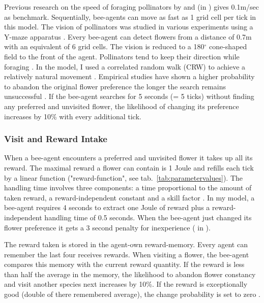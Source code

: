 Previous research on the speed of foraging pollinators by \cite{essenberg2012explaining} and \cite{kunin1991few} (in  \citealt{kunin1996pollinator}) gives 0.1m/sec as benchmark. Sequentially, bee-agents can move as fast as 1 grid cell per tick in this model. The vision of pollinators was studied in various experiments using a Y-maze apparatus \citep{dyer2008comparative, wertlen2008detection, ne2001effect}. Every bee-agent can detect flowers from a distance of 0.7m with an equivalent of 6 grid cells. The vision is reduced to a 180$^{\circ}$ cone-shaped field to the front of the agent. Pollinators tend to keep their direction while foraging \citep{waddington1980flight}. In the model, I used a correlated random walk (CRW) to achieve a relatively natural movement \citep{bartumeus2005animal, codling2008random,  pyke1992flight, viswanathan2008levy}. Empirical studies have shown a higher probability to abandon the original flower preference the longer the search remains unsuccessful \citep{chittka1997foraging,kunin1993sex}. If the bee-agent searches for 5 seconds (= 5 ticks) without finding any preferred and unvisited flower, the likelihood of changing its preference increases by 10\% with every additional tick. \\

\subsubsection*{Visit and Reward Intake}

When a bee-agent encounters a preferred and unvisited flower it takes up all its reward. The maximal reward a flower can contain is 1 Joule and refills each tick by a linear function ("reward-function", see tab.~\ref{tab:parametervalues}). The handling time involves three components: a time proportional to the amount of taken reward, a reward-independent constant and a skill factor \citep{kunin1996pollinator}. In my model, a bee-agent requires 4 seconds to extract one Joule of reward plus a reward-independent handling time of 0.5 seconds. When the bee-agent just changed its flower preference it gets a 3 second penalty for inexperience (\citealt{roubik1992ecology} in  \citealt{kunin1996pollinator}).

The reward taken is stored in the agent-own reward-memory. Every agent can remember the last four receives rewards. When visiting a flower, the bee-agent compares this memory with the current reward quantity. If the reward is less than half the average in the memory, the likelihood to abandon flower constancy and visit another species next increases by 10\%. If the reward is exceptionally good (double of there remembered average), the change probability is set to zero  \citep{chittka1997foraging, keasar1996innate}. 

